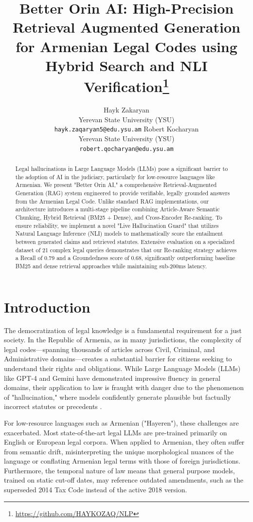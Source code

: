 \documentclass[11pt]{article}
\title{Better Orin AI: High-Precision Retrieval Augmented Generation for Armenian Legal Codes using Hybrid Search and NLI Verification\thanks{\url{https://github.com/HAYKOZAQ/NLP}}}
\author{
  Hayk Zakaryan \\
  Yerevan State University (YSU) \\
  \texttt{hayk.zaqaryan5@edu.ysu.am} \And
  Robert Kocharyan \\
  Yerevan State University (YSU) \\
  \texttt{robert.qocharyan@edu.ysu.am} \\
  }
\begin{document}
\maketitle

\begin{abstract}
Legal hallucinations in Large Language Models (LLMs) pose a significant barrier to the adoption of AI in the judiciary, particularly for low-resource languages like Armenian. We present "Better Orin AI," a comprehensive Retrieval-Augmented Generation (RAG) system engineered to provide verifiable, legally grounded answers from the Armenian Legal Code. Unlike standard RAG implementations, our architecture introduces a multi-stage pipeline combining Article-Aware Semantic Chunking, Hybrid Retrieval (BM25 + Dense), and Cross-Encoder Re-ranking. To ensure reliability, we implement a novel "Live Hallucination Guard" that utilizes Natural Language Inference (NLI) models to mathematically score the entailment between generated claims and retrieved statutes. Extensive evaluation on a specialized dataset of 21 complex legal queries demonstrates that our Re-ranking strategy achieves a Recall of 0.79 and a Groundedness score of 0.68, significantly outperforming baseline BM25 and dense retrieval approaches while maintaining sub-200ms latency.
\end{abstract}

\section{Introduction}

The democratization of legal knowledge is a fundamental requirement for a just society. In the Republic of Armenia, as in many jurisdictions, the complexity of legal codes—spanning thousands of articles across Civil, Criminal, and Administrative domains—creates a substantial barrier for citizens seeking to understand their rights and obligations. While Large Language Models (LLMs) like GPT-4 and Gemini have demonstrated impressive fluency in general domains, their application to law is fraught with danger due to the phenomenon of "hallucination," where models confidently generate plausible but factually incorrect statutes or precedents \citep{lewis2020retrieval}.

For low-resource languages such as Armenian ("Hayeren"), these challenges are exacerbated. Most state-of-the-art legal LLMs are pre-trained primarily on English or European legal corpora. When applied to Armenian, they often suffer from semantic drift, misinterpreting the unique morphological nuances of the language or conflating Armenian legal terms with those of foreign jurisdictions. Furthermore, the temporal nature of law means that general purpose models, trained on static cut-off dates, may reference outdated amendments, such as the superseded 2014 Tax Code instead of the active 2018 version.
\end{document}
